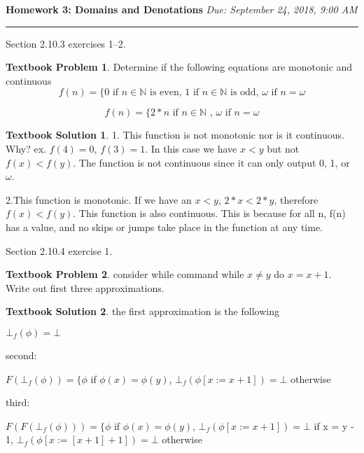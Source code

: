 \documentclass[10pt]{article}
\theoremstyle{definition}
\newtheorem{bp}{Textbook Problem}
\newtheorem{ts}{Textbook Solution}
\begin{document}
  
  
  
  \noindent
  
  \textbf{Homework 3: Domains and Denotations} \hfill \emph{Due: September 24, 2018, 9:00 AM}
  
  \hrule
  
  
  
  \vspace{.3in}
  
  
  
  Section 2.10.3 exercises 1--2.
  
  
  
  \begin{bp}
  Determine if the following equations are monotonic and continuous
  \begin{equation}
  f(n) = \{ 0 \textrm{ if } n \in \mathds{N} \textrm{ is even, } 1 \textrm{ if } n \in \mathds{N} \textrm{ is odd, } \omega \textrm{ if } n = \omega
  \end{equation}
  
  \begin{equation}
  f(n) = \{ 2*n \textrm{ if } n \in \mathds{N} \textrm{ , } \omega \textrm{ if } n = \omega 
  \end{equation}
  
  \end{bp}
  
  \begin{ts}
  
  1. This function is not monotonic nor is it continuous. Why? ex. $f(4) = 0$, $f(3) = 1$. In this case we have $x < y$ but not $f(x) < f(y)$. The function is not continuous since it can only output 0, 1, or $\omega$.
  
  2.This function is monotonic. If we have an $x < y$, $2*x < 2*y$, therefore $f(x) < f(y)$. This function is also continuous. This is because for all n, f(n) has a value, and no skips or jumps take place in the function at any time.  
  \end{ts}
  
  
  
  Section 2.10.4 exercise 1.
  
  \begin{bp}
  
  consider while command while $ x \neq y $ do $x = x + 1 $. Write out first three approximations.
  \end{bp}
  
  \begin{ts}
  the first approximation is the following
  
  $\bot_f (\phi) = \bot$
  
  second:
  
  $F(\bot_f (\phi)) = \{ \phi$ if $\phi(x) = \phi(y)$, $\bot_f(\phi[x := x + 1]) = \bot$ otherwise
  
  third:
  
  $F(F(\bot_f (\phi))) = \{ \phi$ if $\phi(x) = \phi(y)$, $\bot_f(\phi[x := x + 1]) = \bot$ if x = y - 1, $\bot_f(\phi[x := [x + 1] + 1]) = \bot$ otherwise
  
  
  
  \end{ts}
  
\end{document}

